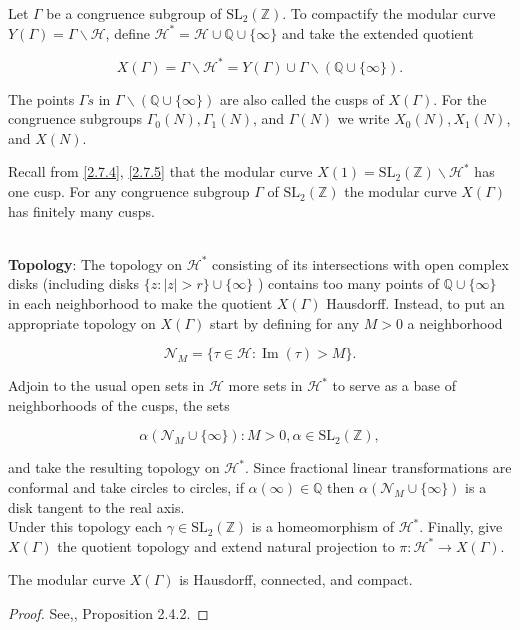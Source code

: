Let $\Gamma$ be a congruence subgroup of $\mathrm{SL}_{2}(\mathbb{Z})$. To compactify the modular curve $Y(\Gamma)=\Gamma \backslash \mathcal{H}$, define $\mathcal{H}^{*}=\mathcal{H} \cup \mathbb{Q} \cup\{\infty\}$ and take the extended quotient

$$
X(\Gamma)=\Gamma \backslash \mathcal{H}^{*}=Y(\Gamma) \cup \Gamma \backslash(\mathbb{Q} \cup\{\infty\}) .
$$

The points $\Gamma s$ in $\Gamma \backslash(\mathbb{Q} \cup\{\infty\})$ are also called the cusps of $X(\Gamma)$. For the congruence subgroups $\Gamma_{0}(N), \Gamma_{1}(N)$, and $\Gamma(N)$ we write $X_{0}(N), X_{1}(N)$, and $X(N)$.

Recall from \ref{2.7.4}, \ref{2.7.5} that the modular curve $X(1)=\mathrm{SL}_{2}(\mathbb{Z}) \backslash \mathcal{H}^{*}$ has one cusp. For any congruence subgroup $\Gamma$ of $\mathrm{SL}_{2}(\mathbb{Z})$ the modular curve $X(\Gamma)$ has finitely many cusps.
 
\\
\textbf{Topology}:
The topology on $\mathcal{H}^{*}$ consisting of its intersections with open complex disks (including disks $\{z:|z|>r\} \cup\{\infty\}$ ) contains too many points of $\mathbb{Q} \cup\{\infty\}$ in each neighborhood to make the quotient $X(\Gamma)$ Hausdorff. Instead, to put an appropriate topology on $X(\Gamma)$ start by defining for any $M>0$ a neighborhood

$$
\mathcal{N}_{M}=\{\tau \in \mathcal{H}: \operatorname{Im}(\tau)>M\} .
$$

Adjoin to the usual open sets in $\mathcal{H}$ more sets in $\mathcal{H}^{*}$ to serve as a base of neighborhoods of the cusps, the sets

$$
\alpha\left(\mathcal{N}_{M} \cup\{\infty\}\right): M>0, \alpha \in \mathrm{SL}_{2}(\mathbb{Z}),
$$

and take the resulting topology on $\mathcal{H}^{*}$. Since fractional linear transformations are conformal and take circles to circles, if $\alpha(\infty) \in \mathbb{Q}$ then $\alpha\left(\mathcal{N}_{M} \cup\{\infty\}\right)$ is a disk tangent to the real axis. \\
Under this topology each $\gamma \in \mathrm{SL}_{2}(\mathbb{Z})$ is a homeomorphism of $\mathcal{H}^{*}$. Finally, give $X(\Gamma)$ the quotient topology and extend natural projection to $\pi: \mathcal{H}^{*} \longrightarrow X(\Gamma)$.

\begin{proposition}
    The modular curve $X(\Gamma)$ is Hausdorff, connected, and compact.
\end{proposition}
\begin{proof}
    See,\cite{diamond2005first}, Proposition 2.4.2.
\end{proof}


